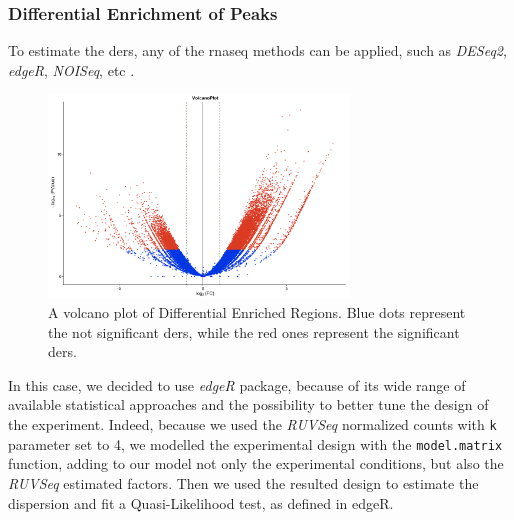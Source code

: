 \subsubsection{Differential Enrichment of Peaks}

To estimate the \glspl{der}, any of the \gls{rnaseq} methods can be applied, such as \textit{DESeq2}, \textit{edgeR}, \textit{NOISeq}, etc \cite{Robinson2009, McCarthy2012, Tarazona2011, Tarazona2015}.

\begin{figure}[H]
\centering
\includegraphics[width=8cm, keepaspectratio]{img/descan2/DE_peaks.png}
\caption[Differential Enriched Regions Volcano]{A volcano plot of Differential Enriched Regions. Blue dots represent the not significant \glspl{der}, while the red ones represent the significant \glspl{der}.}
\label{fig:depeaksdescan}
\end{figure}

In this case, we decided to use \textit{edgeR} package, because of its wide range of  available statistical approaches and the possibility to better tune the design of the experiment. 
Indeed, because we used the \textit{RUVSeq} normalized counts with \lstinline!k! parameter set to 4, we modelled the experimental design with the \lstinline!model.matrix! function, adding to our model not only the experimental conditions, but also the \textit{RUVSeq} estimated factors.
Then we used the resulted design to estimate the dispersion and fit a Quasi-Likelihood test, as defined in edgeR\cite{Robinson2009}.
 

